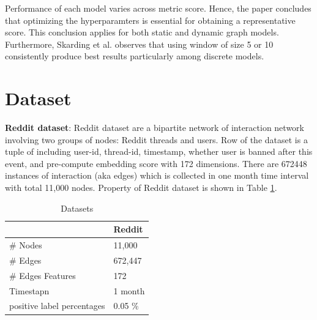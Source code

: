 \documentclass{IEEEtran}
\begin{document}
Performance of each model varies across metric score. Hence, the paper concludes that optimizing the hyperparamters is essential for obtaining a representative score. This conclusion applies for both static and dynamic graph models. Furthermore, Skarding et al. observes that using window of size 5 or 10 consistently produce best results particularly among discrete models.
\section{Dataset}
\label{sec:org3f81a04}
\textbf{Reddit dataset}: Reddit dataset are a bipartite network of interaction network involving two groups of nodes: Reddit threads and users. Row of the dataset is a tuple of including user-id, thread-id, timestamp, whether user is banned after this event, and pre-compute embedding score with 172 dimensions. There are 672448 instances of interaction (aka edges) which is collected in one month time interval with total 11,000 nodes. Property of Reddit dataset is shown in Table \ref{Datasets}.

\begin{table}[htbp]
\caption{\label{Datasets}Datasets}
\centering
\begin{tabular}{ll}
\hline
\hline
 & Reddit\\
\hline
\# Nodes & 11,000\\
\# Edges & 672,447\\
\# Edges Features & 172\\
Timestapn & 1 month\\
positive label percentages & 0.05 \%\\
\end{tabular}
\end{table}
\end{document}
